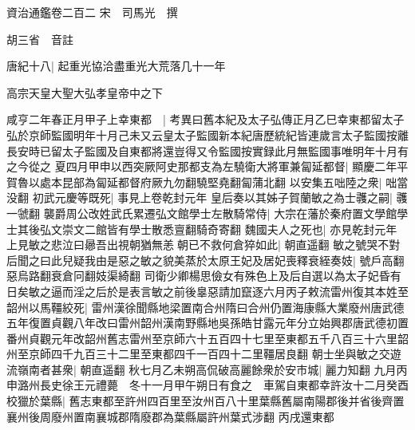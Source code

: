 資治通鑑卷二百二
宋　司馬光　撰

胡三省　音註

唐紀十八|{
	起重光協洽盡重光大荒落几十一年}


高宗天皇大聖大弘孝皇帝中之下

咸亨二年春正月甲子上幸東都　|{
	考異曰舊本紀及太子弘傳正月乙巳幸東都留太子弘於京師監國明年十月己未又云皇太子監國新本紀唐歷統紀皆連歲言太子監國按離長安時已留太子監國及自東都將還豈得又令監國按實録此月無監國事唯明年十月有之今從之}
夏四月甲申以西突厥阿史那都支為左驍衛大將軍兼匐延都督|{
	顯慶二年平賀魯以處本昆部為匐延都督府厥九勿翻驍堅堯翻匐蒲北翻}
以安集五咄陸之衆|{
	咄當没翻}
初武元慶等既死|{
	事見上卷乾封元年}
皇后奏以其姊子賀蘭敏之為士彠之嗣|{
	彠一虢翻}
襲爵周公改姓武氏累遷弘文館學士左散騎常侍|{
	大宗在藩於秦府置文學館學士其後弘文崇文二館皆有學士散悉亶翻騎奇寄翻}
魏國夫人之死也|{
	亦見乾封元年}
上見敏之悲泣曰曏吾出視朝猶無恙朝已不救何倉猝如此|{
	朝直遥翻}
敏之號哭不對后聞之曰此兒疑我由是惡之敏之貌美蒸於太原王妃及居妃喪釋衰絰奏妓|{
	號戶高翻惡烏路翻衰倉冋翻妓渠綺翻}
司衛少卿楊思儉女有殊色上及后自選以為太子妃昏有日矣敏之逼而淫之后於是表言敏之前後辠惡請加竄逐六月丙子敕流雷州復其本姓至韶州以馬韁絞死|{
	雷州漢徐聞縣地梁置南合州隋曰合州仍置海康縣大業廢州唐武德五年復置貞觀八年改曰雷州韶州漢南野縣地吳孫皓甘露元年分立始興郡唐武德初置番州貞觀元年改韶州舊志雷州至京師六十五百四十七里至東都五千八百三十六里韶州至京師四千九百三十二里至東都四千一百四十二里韁居良翻}
朝士坐與敏之交遊流嶺南者甚衆|{
	朝直遥翻}
秋七月乙未朔高侃破高麗餘衆於安市城|{
	麗力知翻}
九月丙申潞州長史徐王元禮薨　冬十一月甲午朔日有食之　車駕自東都幸許汝十二月癸酉校獵於葉縣|{
	舊志東都至許州四百里至汝州百八十里葉縣舊屬南陽郡後并省後齊置襄州後周廢州置南襄城郡隋廢郡為葉縣屬許州葉式涉翻}
丙戌還東都

